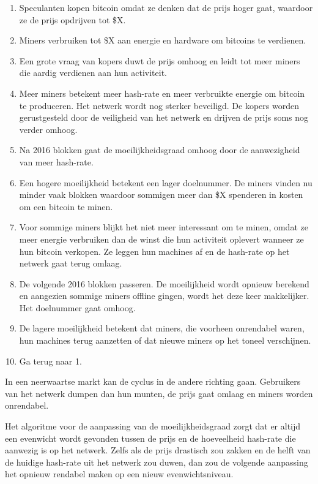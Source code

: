\documentclass[
  letterpaper,
]{scrbook}
\begin{document}
\begin{enumerate}
\def\labelenumi{\arabic{enumi}.}
\item
  Speculanten kopen bitcoin omdat ze denken dat de prijs hoger gaat,
  waardoor ze de prijs opdrijven tot \$X.
\item
  Miners verbruiken tot \$X aan energie en hardware om bitcoins te
  verdienen.
\item
  Een grote vraag van kopers duwt de prijs omhoog en leidt tot meer
  miners die aardig verdienen aan hun activiteit.
\item
  Meer miners betekent meer hash-rate en meer verbruikte energie om
  bitcoin te produceren. Het netwerk wordt nog sterker beveiligd. De
  kopers worden gerustgesteld door de veiligheid van het netwerk en
  drijven de prijs soms nog verder omhoog.
\item
  Na 2016 blokken gaat de moeilijkheidsgraad omhoog door de aanwezigheid
  van meer hash-rate.
\item
  Een hogere moeilijkheid betekent een lager doelnummer. De miners
  vinden nu minder vaak blokken waardoor sommigen meer dan \$X spenderen
  in kosten om een bitcoin te minen.
\item
  Voor sommige miners blijkt het niet meer interessant om te minen,
  omdat ze meer energie verbruiken dan de winst die hun activiteit
  oplevert wanneer ze hun bitcoin verkopen. Ze leggen hun machines af en
  de hash-rate op het netwerk gaat terug omlaag.
\item
  De volgende 2016 blokken passeren. De moeilijkheid wordt opnieuw
  berekend en aangezien sommige miners offline gingen, wordt het deze
  keer makkelijker. Het doelnummer gaat omhoog.
\item
  De lagere moeilijkheid betekent dat miners, die voorheen onrendabel
  waren, hun machines terug aanzetten of dat nieuwe miners op het toneel
  verschijnen.
\item
  Ga terug naar 1.
\end{enumerate}

In een neerwaartse markt kan de cyclus in de andere richting gaan.
Gebruikers van het netwerk dumpen dan hun munten, de prijs gaat omlaag
en miners worden onrendabel.

Het algoritme voor de aanpassing van de moeilijkheidsgraad zorgt dat er
altijd een evenwicht wordt gevonden tussen de prijs en de hoeveelheid
hash-rate die aanwezig is op het netwerk. Zelfs als de prijs drastisch
zou zakken en de helft van de huidige hash-rate uit het netwerk zou
duwen, dan zou de volgende aanpassing het opnieuw rendabel maken op een
nieuw evenwichtsniveau.
\end{document}
